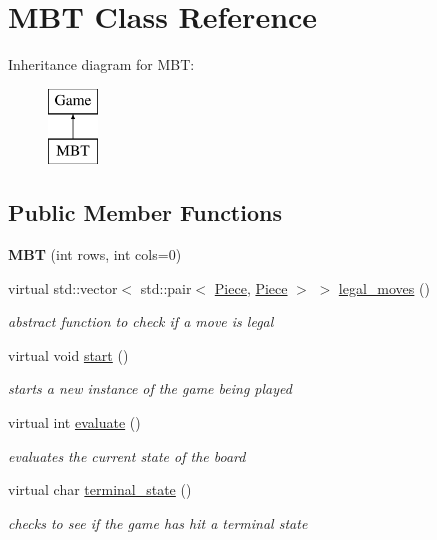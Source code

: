 \hypertarget{class_m_b_t}{}\section{M\+BT Class Reference}
\label{class_m_b_t}
Inheritance diagram for M\+BT\+:\begin{figure}[H]
\begin{center}
\leavevmode
\includegraphics[height=2.000000cm]{class_m_b_t}
\end{center}
\end{figure}
\subsection*{Public Member Functions}
\begin{DoxyCompactItemize}
\item 
\mbox{\label{class_m_b_t_a443c36b0b0281555ead87d21ff92082a}} 
{\bfseries M\+BT} (int rows, int cols=0)
\item 
virtual std\+::vector$<$ std\+::pair$<$ \hyperlink{class_piece}{Piece}, \hyperlink{class_piece}{Piece} $>$ $>$ \hyperlink{class_m_b_t_add9f32f140d4c6fb5e160eadeddd6738}{legal\+\_\+moves} ()
\begin{DoxyCompactList}\small\item\em abstract function to check if a move is legal \end{DoxyCompactList}\item 
virtual void \hyperlink{class_m_b_t_aa951382dfec95e214ba1e63189977d8f}{start} ()
\begin{DoxyCompactList}\small\item\em starts a new instance of the game being played \end{DoxyCompactList}\item 
virtual int \hyperlink{class_m_b_t_a62bfe73fc6dd6da20650f27024dd0115}{evaluate} ()
\begin{DoxyCompactList}\small\item\em evaluates the current state of the board \end{DoxyCompactList}\item 
virtual char \hyperlink{class_m_b_t_ac0b5fc7a538c643ce69a678407fa9f56}{terminal\+\_\+state} ()
\begin{DoxyCompactList}\small\item\em checks to see if the game has hit a terminal state \end{DoxyCompactList}\end{DoxyCompactItemize}
